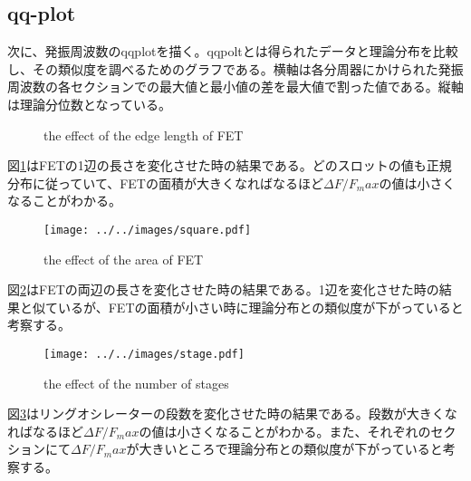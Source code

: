 \documentclass{jsarticle}
\begin{document}
\subsection{qq-plot}
次に、発振周波数のqqplotを描く。qqpoltとは得られたデータと理論分布を比較し、その類似度を調べるためのグラフである。横軸は各分周器にかけられた発振周波数の各セクションでの最大値と最小値の差を最大値で割った値である。縦軸は理論分位数となっている。

\begin{figure}[H]
	\centering
	\caption{the effect of the edge length of FET}
	\label{fig:the_effect_of_the_size_of_fet}
\end{figure}

図\ref{fig:the_effect_of_the_size_of_fet}はFETの1辺の長さを変化させた時の結果である。どのスロットの値も正規分布に従っていて、FETの面積が大きくなればなるほど$\Delta F / F_max$の値は小さくなることがわかる。

\begin{figure}[H]
	\centering
	\texttt{[image: ../../images/square.pdf]}
	\label{fig:square}
	\caption{the effect of the area of FET}
\end{figure}

図\ref{fig:square}はFETの両辺の長さを変化させた時の結果である。1辺を変化させた時の結果と似ているが、FETの面積が小さい時に理論分布との類似度が下がっていると考察する。

\begin{figure}[H]
	\centering
	\texttt{[image: ../../images/stage.pdf]}
	\label{fig:stage}
	\caption{the effect of the number of stages}
\end{figure}

図\ref{fig:stage}はリングオシレーターの段数を変化させた時の結果である。段数が大きくなればなるほど$\Delta F / F_max$の値は小さくなることがわかる。また、それぞれのセクションにて$\Delta F / F_max$が大きいところで理論分布との類似度が下がっていると考察する。
\end{document}
